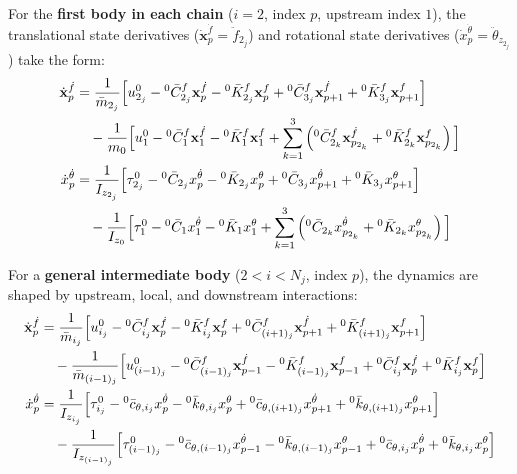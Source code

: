 \documentclass[11pt]{article}
\theoremstyle{definition}
\begin{document}
For the \textbf{first body in each chain} ($i=2$, index $p$, upstream index $1$), the translational state derivatives ($\dot{\mathbf{x}}_{p}^{\dot{f}} = \ddot{f}_{2_j}$) and rotational state derivatives ($\dot{x}_{p}^{\dot{\theta}} = \ddot{\theta}_{z_{2_j}}$) take the form:
\begin{align}
    \dot{\mathbf{x}}_{p}^{\dot{f}} &= 
    \frac{1}{\bar{m}_{2_j}} \Big[ u^0_{2_j} - {}^0\bar{C}^f_{2_j}\mathbf{x}_{p}^{\dot{f}} - {}^0\bar{K}^f_{2_j}\mathbf{x}_{p}^f + {}^0\bar{C}^f_{3_j}\mathbf{x}_{p+1}^{\dot{f}} + {}^0\bar{K}^f_{3_j}\mathbf{x}_{p+1}^f \Big] \notag \\
    &\quad - \frac{1}{m_0} \Big[ u^0_1 - {}^0\bar{C}^f_1\mathbf{x}_{1}^{\dot{f}} - {}^0\bar{K}^f_1 \mathbf{x}_{1}^f + \sum_{k=1}^3 \left( {}^0\bar{C}^f_{2_k}\mathbf{x}_{p_{2_k}}^{\dot{f}} + {}^0\bar{K}^f_{2_k}\mathbf{x}_{p_{2_k}}^f \right) \Big] \\
    \dot{x}_{p}^{\dot{\theta}} &= 
    \frac{1}{I_{z_{2_j}}} \Big[ \tau^0_{2_j} - {}^0\bar{C}_{2_j}x_{p}^{\dot{\theta}} - {}^0\bar{K}_{2_j}x_{p}^{\theta} + {}^0\bar{C}_{3_j}x_{p+1}^{\dot{\theta}} + {}^0\bar{K}_{3_j}x_{p+1}^{\theta} \Big] \notag \\
    &\quad - \frac{1}{I_{z_0}} \Big[ \tau^0_1 - {}^0\bar{C}_1x_{1}^{\dot{\theta}} - {}^0\bar{K}_1 x_{1}^{\theta} + \sum_{k=1}^3 \left( {}^0\bar{C}_{2_k}x_{p_{2_k}}^{\dot{\theta}} + {}^0\bar{K}_{2_k}x_{p_{2_k}}^{\theta} \right) \Big]
\end{align}

For a \textbf{general intermediate body} ($2 < i < N_j$, index $p$), the dynamics are shaped by upstream, local, and downstream interactions:
\begin{align}
    \dot{\mathbf{x}}_{p}^{\dot{f}} &= 
    \frac{1}{\bar{m}_{i_j}} \Big[ u^0_{i_j} - {}^0\bar{C}^f_{i_j}\mathbf{x}_{p}^{\dot{f}} - {}^0\bar{K}^f_{i_j}\mathbf{x}_{p}^f + {}^0\bar{C}^f_{(i+1)_j}\mathbf{x}_{p+1}^{\dot{f}} + {}^0\bar{K}^f_{(i+1)_j}\mathbf{x}_{p+1}^f \Big] \notag \\
    &\quad - \frac{1}{\bar{m}_{(i-1)_j}} \Big[ u^0_{(i-1)_j} - {}^0\bar{C}^f_{(i-1)_j}\mathbf{x}_{p-1}^{\dot{f}} - {}^0\bar{K}^f_{(i-1)_j}\mathbf{x}_{p-1}^f + {}^0\bar{C}^f_{i_j}\mathbf{x}_{p}^{\dot{f}} + {}^0\bar{K}^f_{i_j}\mathbf{x}_{p}^f \Big] \\
    \dot{x}_{p}^{\dot{\theta}} &= 
    \frac{1}{I_{z_{i_j}}} \Big[ \tau^0_{i_j} - {}^0\bar{c}_{\theta,i_j}x_{p}^{\dot{\theta}} - {}^0\bar{k}_{\theta,i_j}x_{p}^{\theta} + {}^0\bar{c}_{\theta,(i+1)_j}x_{p+1}^{\dot{\theta}} + {}^0\bar{k}_{\theta,(i+1)_j}x_{p+1}^{\theta} \Big] \notag \\
    &\quad - \frac{1}{I_{z_{(i-1)_j}}} \Big[ \tau^0_{(i-1)_j} - {}^0\bar{c}_{\theta,(i-1)_j}x_{p-1}^{\dot{\theta}} - {}^0\bar{k}_{\theta,(i-1)_j}x_{p-1}^{\theta} + {}^0\bar{c}_{\theta,i_j}x_{p}^{\dot{\theta}} + {}^0\bar{k}_{\theta,i_j}x_{p}^{\theta} \Big]
\end{align}
\end{document}
